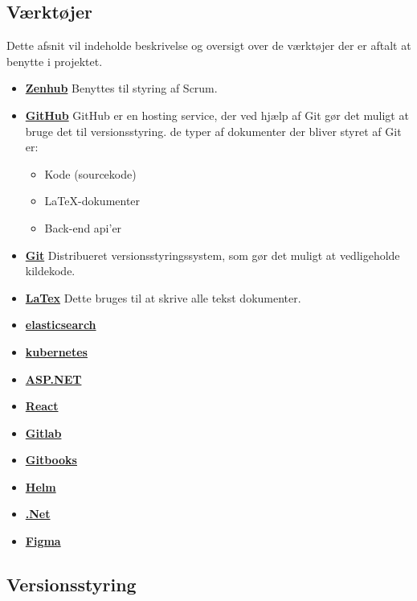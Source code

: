 \subsection{Værktøjer}
Dette afsnit vil indeholde beskrivelse og oversigt over de værktøjer der er aftalt at benytte i projektet.

\begin{itemize}
    \item \underline{\textbf{Zenhub}} Benyttes til styring af Scrum.
    \item \underline{\textbf{GitHub}} GitHub er en hosting service, der ved hjælp af Git gør det muligt at bruge det til versionsstyring. de typer af dokumenter der bliver styret af Git er:
    \begin{itemize}
		\item Kode (sourcekode)
		\item LaTeX-dokumenter
		\item Back-end api'er
	\end{itemize} 
    \item \underline{\textbf{ Git}} Distribueret versionsstyringssystem, som gør det muligt at vedligeholde kildekode. 
    \item \underline{\textbf{LaTex}} Dette bruges til at skrive alle tekst dokumenter.
    \item \underline{\textbf{elasticsearch}}
    \item \underline{\textbf{ kubernetes}}
    \item \underline{\textbf{ ASP.NET}}
    \item \underline{\textbf{ React}}
    \item \underline{\textbf{ Gitlab}}
    \item \underline{\textbf{ Gitbooks}}
    \item \underline{\textbf{ Helm}}
    \item \underline{\textbf{ .Net}}
    \item \underline{\textbf{ Figma}}
   
  
\end{itemize}




\subsection{Versionsstyring}
